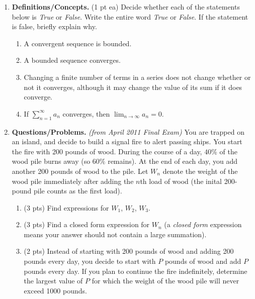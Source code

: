 \documentclass[11pt,letterpaper]{article}
\begin{document}
\begin{enumerate}
\item  \textbf{Definitions/Concepts.} (1 pt ea) Decide whether each of the statements below is \emph{True} or \emph{False}.  Write the entire word \emph{True} or \emph{False}.  If the statement is false, briefly explain why. 
\begin{enumerate}
\item A convergent sequence is bounded.

\vfill
\item A bounded sequence converges.

\vfill 
\item Changing a finite number of terms in a series does not change whether or not it converges, although it may change the value of its sum if it does converge.

\vfill
\item If $\sum_{n=1}^{\infty}a_n$ converges, then $\lim_{n\to\infty}a_n=0$.

\vfill
\end{enumerate}
 
\item \textbf{Questions/Problems.} {\it (from April 2011 Final Exam)} You are trapped on an island, and decide to build a signal fire to alert passing ships.  You start the fire with 200 pounds of wood.  During the course of a day, $40\%$ of the wood pile burns away (so $60\%$ remains).  At the end of each day, you add another 200 pounds of wood to the pile.  Let $W_n$ denote the weight of the wood pile immediately after adding the $n$th load of wood (the inital 200-pound pile counts as the first load).

\begin{enumerate}
\item (3 pts) Find expressions for $W_1$, $W_2$, $W_3$.

\vspace{10pc}
\item (3 pts) Find a closed form expression for $W_n$ (a {\it closed form} expression means your answer should not contain a large summation).

\vspace{8pc}
\item (2 pts) Instead of starting with 200 pounds of wood and adding 200 pounds every day, you decide to start with $P$ pounds of wood and add $P$ pounds every day.  If you plan to continue the fire indefinitely, determine the largest value of $P$ for which the weight of the wood pile will never exceed 1000 pounds.


\end{enumerate}
\end{enumerate}
\end{document}
